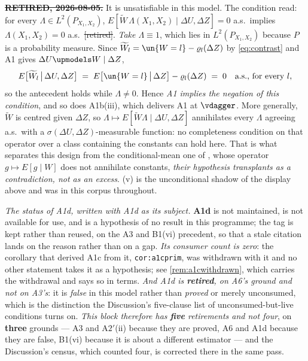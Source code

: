 \begin{assumption}\label{ass:instrcomp}
\textbf{\sout{RETIRED, 2026-08-05.}} It is unsatisfiable in this model. The condition read:
for every $\Lambda\in L^{2}(P_{X_1,X_2})$,
$E[\widetilde W\,\Lambda(X_1,X_2)\mid\Delta U,\Delta Z]=0$ a.s.\ implies
$\Lambda(X_1,X_2)=0$ a.s.\ \sout{[retired]}. \emph{Take $\Lambda\equiv1$}, which lies in
$L^{2}(P_{X_1,X_2})$ because $P$ is a probability measure. Since
$\widetilde W_l=\un\{W=l\}-\varrho_l(\Delta Z)$ by \eqref{eq:contrast} and A1 gives
$\Delta U\upmodels W\mid\Delta Z$,
\[
E\big[\widetilde W_l\,\big|\,\Delta U,\Delta Z\big]\;=\;E\big[\un\{W=l\}\,\big|\,\Delta Z\big]-\varrho_l(\Delta Z)\;=\;0
\quad\text{a.s., for every }l ,
\]
so the antecedent holds while $\Lambda\ne0$. Hence \emph{A1 implies the negation of this condition},
and so does A1b(iii), which delivers A1 at $\vdagger$. More generally, $\widetilde W$ is centred
given $\Delta Z$, so $\Lambda\mapsto E[\widetilde W\Lambda\mid\Delta U,\Delta Z]$ annihilates every
$\Lambda$ agreeing a.s.\ with a $\sigma(\Delta U,\Delta Z)$-measurable function: no completeness
condition on that operator over a class containing the constants can hold here. That is what separates
this design from the conditional-mean one of \citet{feve2014}, whose operator $g\mapsto E[g\mid W]$ does
not annihilate constants, \emph{their hypothesis transplants as a contradiction, not as an excess}.
\textup{(v)} is the unconditional shadow of the display above and was in this
corpus throughout.

\emph{The status of A1d, written with A1d as its subject.} \textbf{A1d} is not maintained, is not
available for use, and is a hypothesis of no result in this programme; the tag is kept rather than
reused, on the A3 and B1(vi) precedent, so that a stale citation lands on the reason rather than on a
gap. \emph{Its consumer count is zero}: the corollary that derived A1c from it, \texttt{cor:a1cprim},
was withdrawn with it and no other statement takes it as a hypothesis; see \cref{rem:a1cwithdrawn}, which
carries the withdrawal and says so in terms. \emph{And A1d is \textbf{retired}, on A6's ground and not on
A3's}: it is \emph{false} in this model rather than \emph{proved} or merely unconsumed, which is the
distinction the Discussion's five-clause list of unconsumed-but-live conditions turns on. \emph{This
block therefore has \textbf{five} retirements and not four}, on \textbf{three} grounds --- A3 and
A$2'$(ii) because they are proved, A6 and A1d because they are false, B1(vi) because it is about a
different estimator --- and the Discussion's census, which counted four, is corrected there in the same
pass.
\end{assumption}
